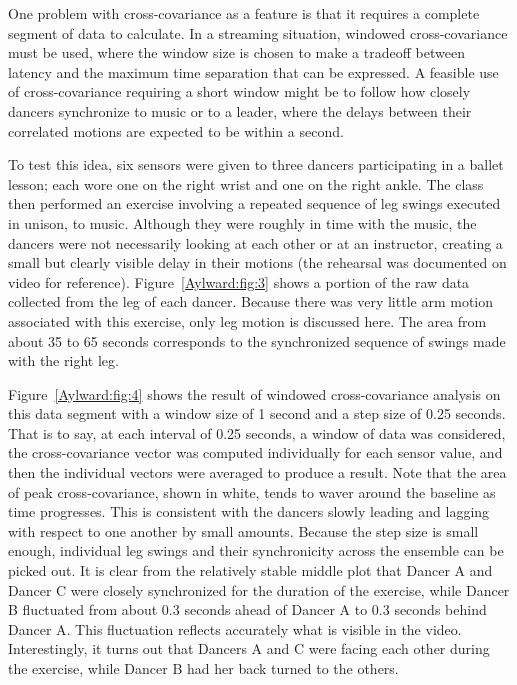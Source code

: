 One problem with cross-covariance as a feature is that it requires a complete
segment of data to calculate.  In a streaming situation, windowed
cross-covariance must be used, where the window size is chosen to make a tradeoff
between latency and the maximum time separation that can be expressed. A feasible
use of cross-covariance requiring a short window might be to follow how closely
dancers synchronize to music or to a leader, where the delays between their
correlated motions are expected to be within a second.

To test this idea, six sensors were given to three dancers participating in a
ballet lesson; each wore one on the right wrist and one on the right ankle. The
class then performed an exercise involving a repeated sequence of leg swings
executed in unison, to music.  Although they were roughly in time with the music,
the dancers were not necessarily looking at each other or at an instructor,
creating a small but clearly visible delay in their motions (the rehearsal was
documented on video for reference).  Figure~\ref{Aylward:fig:3} shows a portion of the raw data
collected from the leg of each dancer.  Because there was very little arm motion
associated with this exercise, only leg motion is discussed here. The area from
about 35 to 65 seconds corresponds to the synchronized sequence of swings made
with the right leg.

Figure~\ref{Aylward:fig:4} shows the result of windowed cross-covariance analysis on this data
segment with a window size of 1 second and a step size of 0.25 seconds. That is
to say, at each interval of 0.25 seconds, a window of data was considered, the
cross-covariance vector was computed individually for each sensor value, and then
the individual vectors were averaged to produce a result. Note that the area of
peak cross-covariance, shown in white, tends to waver around the baseline as time
progresses. This is consistent with the dancers slowly leading and lagging with
respect to one another by small amounts. Because the step size is small enough,
individual leg swings and their synchronicity across the ensemble can be picked
out. It is clear from the relatively stable middle plot that Dancer A and Dancer
C were closely synchronized for the duration of the exercise, while Dancer B
fluctuated from about 0.3 seconds ahead of Dancer A to 0.3 seconds behind Dancer
A. This fluctuation reflects accurately what is visible in the video.
Interestingly, it turns out that Dancers A and C were facing each other during
the exercise, while Dancer B had her back turned to the others.


